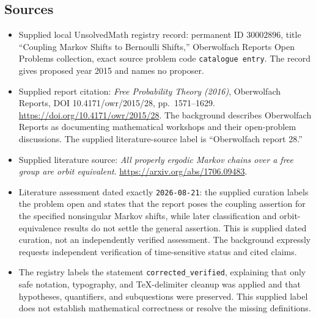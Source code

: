 \documentclass[11pt]{article}
\begin{document}
\subsection{Sources}
\begin{itemize}
\item Supplied local UnsolvedMath registry record: permanent ID \(30002896\), title ``Coupling Markov Shifts to Bernoulli Shifts,'' Oberwolfach Reports Open Problems collection, exact source problem code \texttt{catalogue entry}. The record gives proposed year 2015 and names no proposer.
\item Supplied report citation: \emph{Free Probability Theory (2016)}, Oberwolfach Reports, DOI 10.4171/owr/2015/28, pp.\ 1571--1629. \url{https://doi.org/10.4171/owr/2015/28}. The background describes Oberwolfach Reports as documenting mathematical workshops and their open-problem discussions. The supplied literature-source label is ``Oberwolfach report 28.''
\item Supplied literature source: \emph{All properly ergodic Markov chains over a free group are orbit equivalent}. \url{https://arxiv.org/abs/1706.09483}.
\item Literature assessment dated exactly \texttt{2026-08-21}: the supplied curation labels the problem open and states that the report poses the coupling assertion for the specified nonsingular Markov shifts, while later classification and orbit-equivalence results do not settle the general assertion. This is supplied dated curation, not an independently verified assessment. The background expressly requests independent verification of time-sensitive status and cited claims.
\item The registry labels the statement \texttt{corrected\_verified}, explaining that only safe notation, typography, and TeX-delimiter cleanup was applied and that hypotheses, quantifiers, and subquestions were preserved. This supplied label does not establish mathematical correctness or resolve the missing definitions.
\end{itemize}
\end{document}
